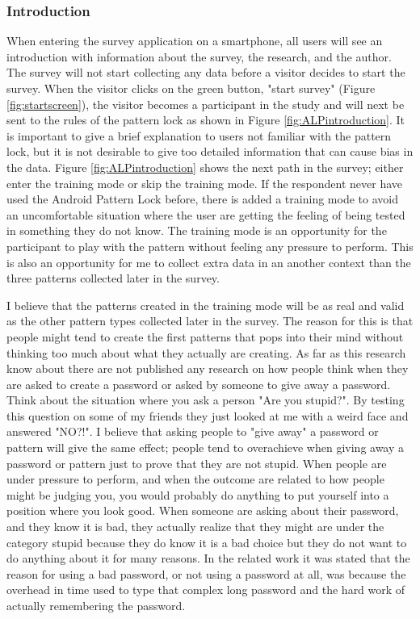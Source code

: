     \subsubsection*{Introduction}
      When entering the survey application on a smartphone, all users will see an introduction with information about the survey, the research, and the author. The survey will not start collecting any data before a visitor decides to start the survey. When the visitor clicks on the green button, "start survey" (Figure \ref{fig:startscreen}), the visitor becomes a participant in the study and will next be sent to the rules of the pattern lock as shown in Figure \ref{fig:ALPintroduction}. It is important to give a brief explanation to users not familiar with the pattern lock, but it is not desirable to give too detailed information that can cause bias in the data. Figure \ref{fig:ALPintroduction} shows the next path in the survey; either enter the training mode or skip the training mode. If the respondent never have used the Android Pattern Lock before, there is added a training mode to avoid an uncomfortable situation where the user are getting the feeling of being tested in something they do not know. The training mode is an opportunity for the participant to play with the pattern without feeling any pressure to perform. This is also an opportunity for me to collect extra data in an another context than the three patterns collected later in the survey.

      I believe that the patterns created in the training mode will be as real and valid as the other pattern types collected later in the survey. The reason for this is that people might tend to create the first patterns that pops into their mind without thinking too much about what they actually are creating. As far as this research know about there are not published any research on how people think when they are asked to create a password or asked by someone to give away a password. Think about the situation where you ask a person "Are you stupid?". By testing this question on some of my friends they just looked at me with a weird face and answered "NO?!". I believe that asking people to "give away" a password or pattern will give the same effect; people tend to overachieve when giving away a password or pattern just to prove that they are not stupid. When people are under pressure to perform, and when the outcome are related to how people might be judging you, you would probably do anything to put yourself into a position where you look good. When someone are asking about their password, and they know it is bad, they actually realize that they might are under the category stupid because they do know it is a bad choice but they do not want to do anything about it for many reasons. In the related work it was stated that the reason for using a bad password, or not using a password at all, was because the overhead in time used to type that complex long password and the hard work of actually remembering the password. 


